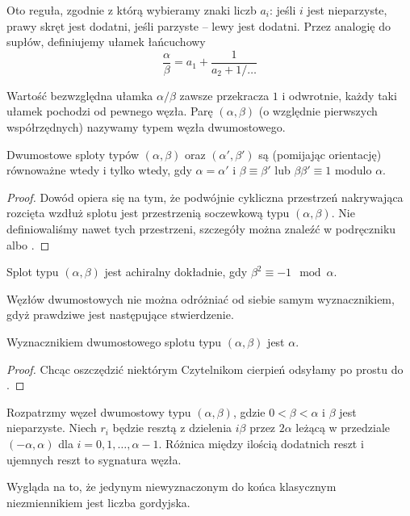 
Oto reguła, zgodnie z którą wybieramy znaki liczb $a_i$:
jeśli $i$ jest nieparzyste, prawy skręt jest dodatni, jeśli parzyste -- lewy jest dodatni.
Przez analogię do supłów, definiujemy ułamek łańcuchowy
\[
	\frac \alpha \beta = a_1 + \frac{1}{a_2 + 1/\ldots}
\]

Wartość bezwzględna ułamka $\alpha/\beta$ zawsze przekracza $1$ i odwrotnie, każdy taki ułamek pochodzi od pewnego węzła.
Parę $(\alpha, \beta)$ (o względnie pierwszych współrzędnych) nazywamy typem węzła dwumostowego.

\begin{proposition}
\label{prp:tangle_equivalence}
	Dwumostowe sploty typów $(\alpha, \beta)$ oraz $(\alpha', \beta')$ są (pomijając orientację) równoważne wtedy i tylko wtedy, gdy $\alpha = \alpha'$ i $\beta \equiv \beta'$ lub $\beta \beta'\equiv 1$ modulo $\alpha$.
\end{proposition}

\begin{proof}
	Dowód opiera się na tym, że podwójnie cykliczna przestrzeń nakrywająca rozcięta wzdłuż splotu jest przestrzenią soczewkową typu $(\alpha, \beta)$.
	Nie definiowaliśmy nawet tych przestrzeni, szczegóły można znaleźć w podręczniku \cite{murasugi96} albo \cite{schubert56}.
\end{proof}

\begin{proposition}
\label{prp:chiral_tangles}
	Splot typu $(\alpha, \beta)$ jest achiralny dokładnie, gdy $\beta^2 \equiv -1 \mod \alpha$.
\end{proposition}

Węzłów dwumostowych nie można odróżniać od siebie samym wyznacznikiem, gdyż prawdziwe jest następujące stwierdzenie.

\begin{proposition}
\label{prp:tangle_determinant}
	Wyznacznikiem dwumostowego splotu typu $(\alpha, \beta)$ jest $\alpha$.
\end{proposition}

\begin{proof}
	Chcąc oszczędzić niektórym Czytelnikom cierpień odsyłamy po prostu do \cite{schubert56}.
\end{proof}

\begin{proposition}
\label{prp:tangle_signature}
	Rozpatrzmy węzeł dwumostowy typu $(\alpha, \beta)$, gdzie $0 < \beta < \alpha$ i $\beta$ jest nieparzyste.
	Niech $r_i$ będzie resztą z dzielenia $i\beta$ przez $2\alpha$ leżącą w przedziale $(-\alpha, \alpha)$ dla $i = 0, 1, \ldots, \alpha - 1$.
	Różnica między ilością dodatnich reszt i ujemnych reszt to sygnatura węzła.
\end{proposition}

Wygląda na to, że jedynym niewyznaczonym do końca klasycznym niezmiennikiem jest liczba gordyjska.

